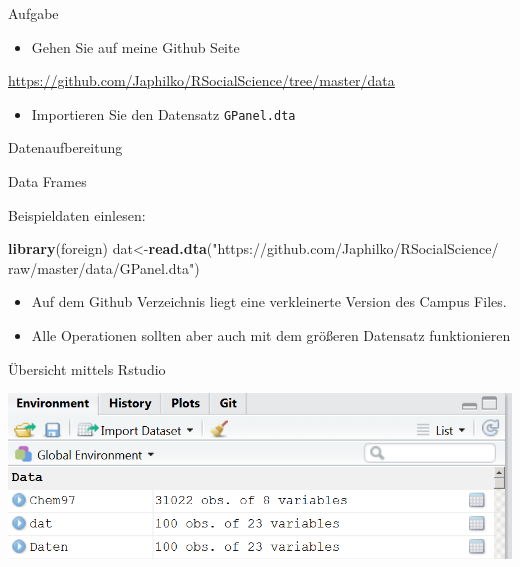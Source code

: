 \documentclass[ignorenonframetext,]{beamer}
\newenvironment{Shaded}{}{}
\newcommand{\KeywordTok}[1]{\textcolor[rgb]{0.00,0.44,0.13}{\textbf{{#1}}}}
\newcommand{\StringTok}[1]{\textcolor[rgb]{0.25,0.44,0.63}{{#1}}}
\newcommand{\NormalTok}[1]{{#1}}
\providecommand{\tightlist}{%
\setlength{\itemsep}{0pt}\setlength{\parskip}{0pt}}
\begin{document}
\begin{frame}[fragile]{Aufgabe}

\begin{itemize}
\tightlist
\item
  Gehen Sie auf meine Github Seite
\end{itemize}

\url{https://github.com/Japhilko/RSocialScience/tree/master/data}

\begin{itemize}
\tightlist
\item
  Importieren Sie den Datensatz \texttt{GPanel.dta}
\end{itemize}

\end{frame}

\begin{frame}{Datenaufbereitung}

\end{frame}

\begin{frame}[fragile]{Data Frames}

\begin{block}{Beispieldaten einlesen:}

\begin{Shaded}
\begin{Highlighting}[]
\KeywordTok{library}\NormalTok{(foreign)}
\NormalTok{dat<-}\KeywordTok{read.dta}\NormalTok{(}\StringTok{"https://github.com/Japhilko/RSocialScience/}
\StringTok{              raw/master/data/GPanel.dta"}\NormalTok{)}
\end{Highlighting}
\end{Shaded}

\begin{itemize}
\tightlist
\item
  Auf dem Github Verzeichnis liegt eine verkleinerte Version des Campus
  Files.
\item
  Alle Operationen sollten aber auch mit dem größeren Datensatz
  funktionieren
\end{itemize}

\end{block}

\end{frame}

\begin{frame}{Übersicht mittels Rstudio}

\includegraphics{./tex2pdf.956/46e5b1121194c894f424f27d4be84216d8efec9e.png}

\end{frame}
\end{document}
